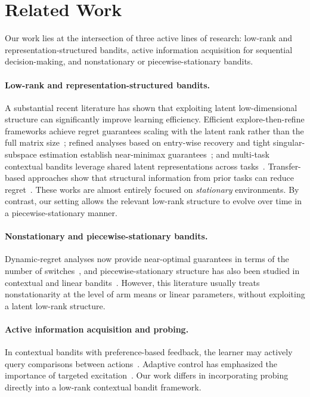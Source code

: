 \documentclass{article}
\begin{document}
\section{Related Work}
\label{sec:related}

Our work lies at the intersection of three active lines of research: low-rank and representation-structured bandits, active information acquisition for sequential decision-making, and nonstationary or piecewise-stationary bandits.

\paragraph{Low-rank and representation-structured bandits.}
A substantial recent literature has shown that exploiting latent low-dimensional structure can significantly improve learning efficiency.
Efficient explore-then-refine frameworks achieve regret guarantees scaling with the latent rank rather than the full matrix size~\citep{kang2022gestt}; refined analyses based on entry-wise recovery and tight singular-subspace estimation establish near-minimax guarantees~\citep{stojanovic2023spectral,pmlr-v235-jedra24a,pmlr-v235-jang24e}; and multi-task contextual bandits leverage shared latent representations across tasks~\citep{pmlr-v235-lin24o,russo2023globalLocal}.
Transfer-based approaches show that structural information from prior tasks can reduce regret~\citep{cai2024transfer,park2024latentcontinuity}.
These works are almost entirely focused on \emph{stationary} environments.
By contrast, our setting allows the relevant low-rank structure to evolve over time in a piecewise-stationary manner.

\paragraph{Nonstationary and piecewise-stationary bandits.}
Dynamic-regret analyses now provide near-optimal guarantees in terms of the number of switches~\citep{abbasi2023dynamic,komiyama2024adr}, and piecewise-stationary structure has also been studied in contextual and linear bandits~\citep{hou2024pslb,pmlr-v267-lazzaro25a}.
However, this literature usually treats nonstationarity at the level of arm means or linear parameters, without exploiting a latent low-rank structure.

\paragraph{Active information acquisition and probing.}
In contextual bandits with preference-based feedback, the learner may actively query comparisons between actions~\citep{sekhari2023aurora}.
Adaptive control has emphasized the importance of targeted excitation~\citep{memmel2024asid,xu2025leqr}.
Our work differs in incorporating probing directly into a low-rank contextual bandit framework.
\end{document}

